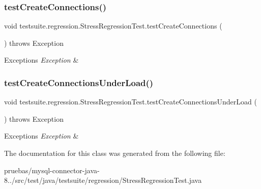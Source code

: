 \subsubsection{\texorpdfstring{test\+Create\+Connections()}{testCreateConnections()}}
{\footnotesize\ttfamily void testsuite.\+regression.\+Stress\+Regression\+Test.\+test\+Create\+Connections (\begin{DoxyParamCaption}{ }\end{DoxyParamCaption}) throws Exception}


\begin{DoxyExceptions}{Exceptions}
{\em Exception} & \\
\hline
\end{DoxyExceptions}
\mbox{\label{classtestsuite_1_1regression_1_1_stress_regression_test_a1aff86540d35db22db56f48ffeb64b9d}} 
\subsubsection{\texorpdfstring{test\+Create\+Connections\+Under\+Load()}{testCreateConnectionsUnderLoad()}}
{\footnotesize\ttfamily void testsuite.\+regression.\+Stress\+Regression\+Test.\+test\+Create\+Connections\+Under\+Load (\begin{DoxyParamCaption}{ }\end{DoxyParamCaption}) throws Exception}


\begin{DoxyExceptions}{Exceptions}
{\em Exception} & \\
\hline
\end{DoxyExceptions}


The documentation for this class was generated from the following file\+:\begin{DoxyCompactItemize}
\item 
pruebas/mysql-\/connector-\/java-\/8../src/test/java/testsuite/regression/Stress\+Regression\+Test.\+java\end{DoxyCompactItemize}

